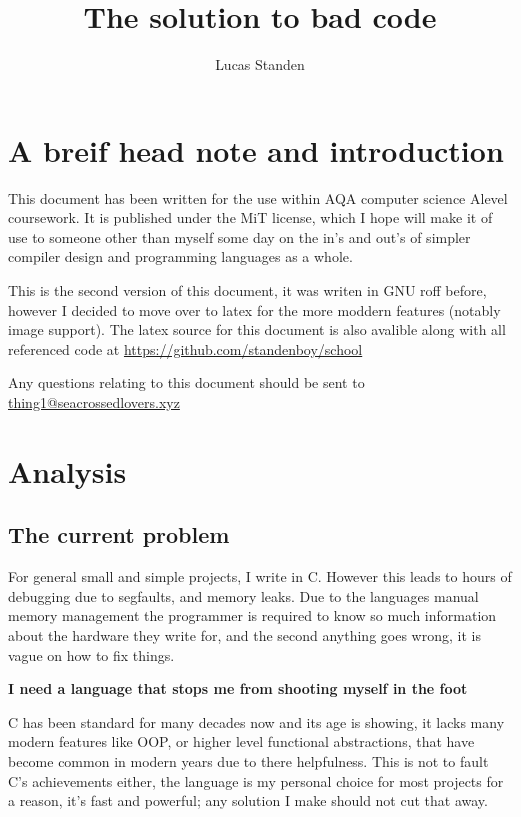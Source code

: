 \documentclass[a4paper,12pt]{article}
\author{Lucas Standen}
\title{The solution to bad code}
\begin{document}
\maketitle
\newpage
\tableofcontents
\newpage

{\setlength{\parindent}{0cm}

\section{A breif head note and introduction}
This document has been written for the use within AQA computer science 
Alevel coursework. It is published under the MiT license, which I hope
will make it of use to someone other than myself some day on the in's
and out's of simpler compiler design and programming languages as a
whole.

This is the second version of this document, it was writen in GNU
roff before, however I decided to move over to latex for the
more moddern features (notably image support). The latex source for
this document is also avalible along with all referenced code at 
\url{https://github.com/standenboy/school}

Any questions relating to this document should be sent to 
\href{mailto:thing1@seacrossedlovers.xyz}{thing1@seacrossedlovers.xyz}

\section{Analysis}
\subsection{The current problem}
For general small and simple projects, I write in C. However this leads to
hours of debugging due to segfaults, and memory leaks. Due to the languages 
manual memory management the programmer is required to know so much 
information about the hardware they write for, and the second anything goes
wrong, it is vague on how to fix things.

\textbf{I need a language that stops me from shooting myself in the foot}

C has been standard for many decades now and its age is showing, it lacks
many modern features like OOP, or higher level functional abstractions, 
that have become common in modern years due to there helpfulness. This is 
not to fault C's achievements either, the language is my personal choice for
most projects for a reason, it's fast and powerful; any solution I make
should not cut that away.

}
\end{document}
